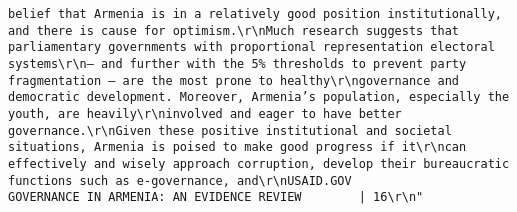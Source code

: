 \documentclass[
]{article}
\begin{document}
\begin{verbatim}
belief that Armenia is in a relatively good position institutionally, and there is cause for optimism.\r\nMuch research suggests that parliamentary governments with proportional representation electoral systems\r\n— and further with the 5% thresholds to prevent party fragmentation — are the most prone to healthy\r\ngovernance and democratic development. Moreover, Armenia’s population, especially the youth, are heavily\r\ninvolved and eager to have better governance.\r\nGiven these positive institutional and societal situations, Armenia is poised to make good progress if it\r\ncan effectively and wisely approach corruption, develop their bureaucratic functions such as e-governance, and\r\nUSAID.GOV                                                     GOVERNANCE IN ARMENIA: AN EVIDENCE REVIEW        | 16\r\n"                                                                                                                                                                                                                                                                                                                                                                                                                                                                                                                                                                                                                                                                                                                                                                                                                                                                                                                                      

\end{verbatim}
\end{document}
